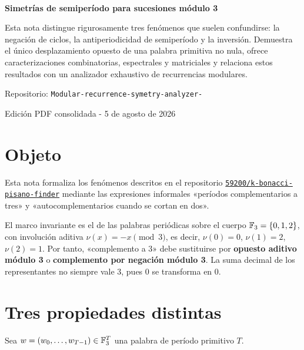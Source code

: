 \documentclass[11pt,a4paper]{article}
\begin{document}
\begin{titlepage}\thispagestyle{empty}\vspace*{22mm}{\color{accent}\rule{\textwidth}{1.2pt}}\\[15mm]{\fontsize{27}{33}\selectfont\bfseries\color{ink}Simetrías de semiperíodo para sucesiones módulo 3\par}\vspace{13mm}\begin{summarybox}Esta nota distingue rigurosamente tres fenómenos que suelen confundirse: la negación de ciclos, la antiperiodicidad de semiperíodo y la inversión. Demuestra el único desplazamiento opuesto de una palabra primitiva no nula, ofrece caracterizaciones combinatorias, espectrales y matriciales y relaciona estos resultados con un analizador exhaustivo de recurrencias modulares.\end{summarybox}\vfill{\large\color{muted}Repositorio: \texttt{Modular-recurrence-symetry-analyzer-}\par}{\large\color{muted}Edición PDF consolidada - 5 de agosto de 2026\par}\vspace{12mm}{\color{accent}\rule{\textwidth}{1.2pt}}\end{titlepage}
\renewcommand{\contentsname}{Índice}\tableofcontents\clearpage
\section{Objeto}
Esta nota formaliza los fenómenos descritos en el repositorio \href{https://github.com/59200/k-bonacci-pisano-finder}{\texttt{59200/k-bonacci-pisano-finder}} mediante las expresiones informales «períodos complementarios a tres» y «autocomplementarios cuando se cortan en dos».

El marco invariante es el de las palabras periódicas sobre el cuerpo \(\mathbb F_3=\{0,1,2\}\), con involución aditiva \(\nu(x)=-x\pmod3\), es decir, \(\nu(0)=0\), \(\nu(1)=2\), \(\nu(2)=1\). Por tanto, «complemento a 3» debe sustituirse por \textbf{opuesto aditivo módulo 3} o \textbf{complemento por negación módulo 3}. La suma decimal de los representantes no siempre vale 3, pues 0 se transforma en 0.
\section{Tres propiedades distintas}
Sea \(w=(w_0,\ldots,w_{T-1})\in\mathbb F_3^T\) una palabra de período primitivo \(T\).
\end{document}
